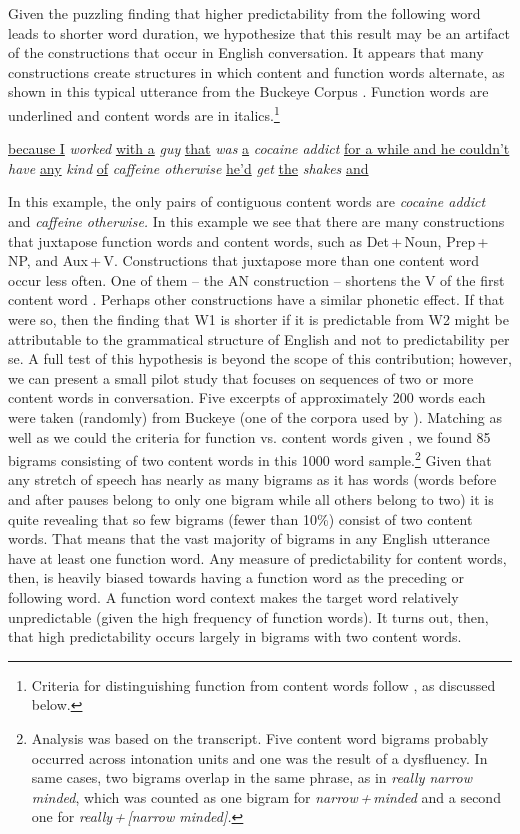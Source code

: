 \documentclass[output=paper]{langscibook}
\begin{document}
Given the puzzling finding that higher predictability from the following word leads to shorter word duration, we hypothesize that this result may be an artifact of the constructions that occur in English conversation. It appears that many constructions create structures in which content and function words alternate, as shown in this typical utterance from the Buckeye Corpus \citep{PittEtAl2007}. Function words are underlined and content words are in italics.\footnote{Criteria for distinguishing function from content words follow \citet{BellJurafsky2009}, as discussed below.}

\ea\label{ex:bybee:1}
\uline{because I} \textit{worked} \uline{with a} \textit{guy} \uline{that} \textit{was} \uline{a} \textit{cocaine addict} \uline{for a while and he couldn't} \textit{have} \uline{any} \textit{kind} \uline{of} \textit{caffeine otherwise} \uline{he'd} \textit{get} \uline{the} \textit{shakes} \uline{and}
\z

In this example, the only pairs of contiguous content words are \textit{cocaine addict} and \textit{caffeine otherwise.} In this example we see that there are many constructions that juxtapose function words and content words, such as Det\,+\,Noun, Prep\,+\,NP, and Aux\,+\,V. Constructions that juxtapose more than one content word occur less often. One of them -- the AN construction -- shortens the V of the first content word \citep{Morrill2011}. Perhaps other constructions have a similar phonetic effect. If that were so, then the finding that W1 is shorter if it is predictable from W2 might be attributable to the grammatical structure of English and not to predictability per se. A full test of this hypothesis is beyond the scope of this contribution; however, we can present a small pilot study that focuses on sequences of two or more content words in conversation. Five excerpts of approximately 200 words each were taken (randomly) from Buckeye (one of the corpora used by \citealt{BellJurafsky2009}). Matching as well as we could the criteria for function vs. content words given \citet{BellJurafsky2009}, we found 85 bigrams consisting of two content words in this 1000 word sample.\footnote{Analysis was based on the transcript. Five content word bigrams probably occurred across intonation units and one was the result of a dysfluency. In same cases, two bigrams overlap in the same phrase, as in \textit{really narrow minded}, which was counted as one bigram for \textit{narrow\,+\,minded} and a second one for \textit{really\,+\,[narrow minded].}} Given that any stretch of speech has nearly as many bigrams as it has words (words before and after pauses belong to only one bigram while all others belong to two) it is quite revealing that so few bigrams (fewer than 10\%) consist of two content words. That means that the vast majority of bigrams in any English utterance have at least one function word. Any measure of predictability for content words, then, is heavily biased towards having a function word as the preceding or following word. A function word context makes the target word relatively unpredictable (given the high frequency of function words). It turns out, then, that high predictability occurs largely in bigrams with two content words.
\end{document}
